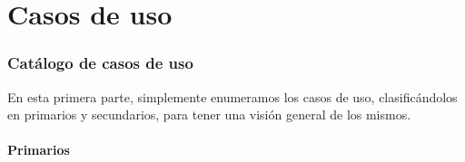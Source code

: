 \documentclass[spanish,a4paper,12pt]{report}		%
\begin{document}
\newpage




\part{Casos de uso} %

\section{Catálogo de casos de uso}		%
En esta primera parte, simplemente enumeramos los casos de uso, clasificándolos en primarios y secundarios, para tener una visión general de los mismos.
\subsection{Primarios} 				%
\end{document}
